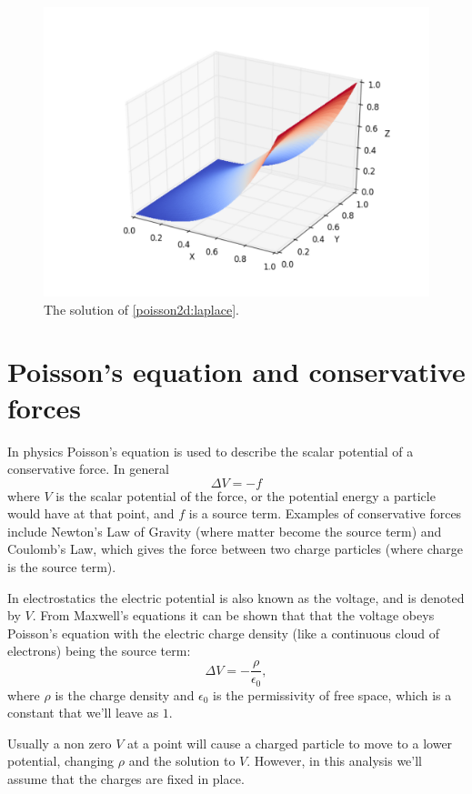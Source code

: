 \begin{figure}
\includegraphics[width=\textwidth]{Laplace.pdf}
\caption{The solution of \eqref{poisson2d:laplace}.}
\end{figure}

\section*{Poisson's equation and conservative forces}
In physics Poisson's equation is used to describe the scalar potential of a conservative force.
In general
\[ \Delta V = - f\]
where $V$ is the scalar potential of the force, or the potential energy a particle would have at that point, and $f$ is a source term.
Examples of conservative forces include Newton's Law of Gravity (where matter become the source term) and Coulomb's Law, which gives the force between two charge particles (where charge is the source term).

In electrostatics the electric potential is also known as the voltage, and is denoted by $V.$ 
From Maxwell's equations it can be shown that that the voltage obeys Poisson's equation with the electric charge density (like a continuous cloud of electrons) being the source term: 
\[
 \Delta V = -\frac{\rho}{\epsilon_0},
\]
where $\rho$ is the charge density and $\epsilon_0$ is the permissivity of 
free space, which is a constant that we'll leave as $1$.

Usually a non zero $V$ at a point will cause a charged particle to move to a lower potential, changing $\rho$ and the solution to $V$.
However, in this analysis we'll assume that the charges are fixed in place.

